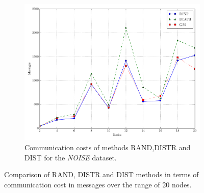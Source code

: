 \begin{figure}[!htb]
\begin{subfigure}{0.32\textwidth}
\end{subfigure}\hfill
\begin{subfigure}{0.32\textwidth}%
  \includegraphics[width=\linewidth]{img/matching_msg_noisyinterweaving.pdf}
  \caption{Communication costs of methods RAND,DISTR and DIST for the \emph{NOISE} dataset.}
\end{subfigure}
\vspace{0.5cm}
\caption{Comparison of RAND, DISTR and DIST methods in terms of communication cost in messages over the range of 20 nodes.} \label{fig:matchingComp-msgs}
\end{figure}

